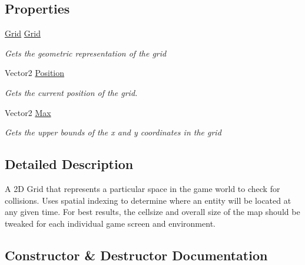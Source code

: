 \subsection*{Properties}
\begin{DoxyCompactItemize}
\item 
\hyperlink{class_midnight_blue_1_1_engine_1_1_geometry_1_1_grid}{Grid} \hyperlink{class_midnight_blue_1_1_engine_1_1_collision_1_1_collision_map_a4874d2a5ecd291536bed6d32c10cb5e8}{Grid}
\begin{DoxyCompactList}\small\item\em Gets the geometric representation of the grid \end{DoxyCompactList}\item 
Vector2 \hyperlink{class_midnight_blue_1_1_engine_1_1_collision_1_1_collision_map_a4221dbaa3fcdcd868a8fb6e9eccbd924}{Position}
\begin{DoxyCompactList}\small\item\em Gets the current position of the grid. \end{DoxyCompactList}\item 
Vector2 \hyperlink{class_midnight_blue_1_1_engine_1_1_collision_1_1_collision_map_a98bc019f889435855333b26feb840b20}{Max}
\begin{DoxyCompactList}\small\item\em Gets the upper bounds of the x and y coordinates in the grid \end{DoxyCompactList}\end{DoxyCompactItemize}


\subsection{Detailed Description}
A 2D Grid that represents a particular space in the game world to check for collisions. Uses spatial indexing to determine where an entity will be located at any given time. For best results, the cellsize and overall size of the map should be tweaked for each individual game screen and environment. 



\subsection{Constructor \& Destructor Documentation}
\hypertarget{class_midnight_blue_1_1_engine_1_1_collision_1_1_collision_map_ac0f2a2ca0e0dc469d86cef325c6e20ac}{}\label{class_midnight_blue_1_1_engine_1_1_collision_1_1_collision_map_ac0f2a2ca0e0dc469d86cef325c6e20ac} 
